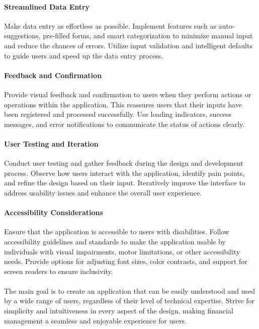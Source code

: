 \paragraph{Streamlined Data Entry}
Make data entry as effortless as possible. Implement features such as auto-suggestions, 
pre-filled forms, and smart categorization to minimize manual input and reduce the chances of errors. Utilize 
input validation and intelligent defaults to guide users and speed up the data entry process.

\paragraph{Feedback and Confirmation}
Provide visual feedback and confirmation to users when they perform actions or operations 
within the application. This reassures users that their inputs have been registered and processed successfully. 
Use loading indicators, success messages, and error notifications to communicate the status of actions clearly.

\paragraph{User Testing and Iteration}
Conduct user testing and gather feedback during the design and development process. 
Observe how users interact with the application, identify pain points, and refine the design based on their input. 
Iteratively improve the interface to address usability issues and enhance the overall user experience.

\paragraph{Accessibility Considerations}
Ensure that the application is accessible to users with disabilities. Follow 
accessibility guidelines and standards to make the application usable by individuals with visual impairments, 
motor limitations, or other accessibility needs. Provide options for adjusting font sizes, color contrasts, and 
support for screen readers to ensure inclusivity.\\
\\

The main goal is to create an application that can be easily understood and used by a wide range of users, 
regardless of their level of technical expertise. Strive for simplicity and intuitiveness in every aspect of the 
design, making financial management a seamless and enjoyable experience for users.


